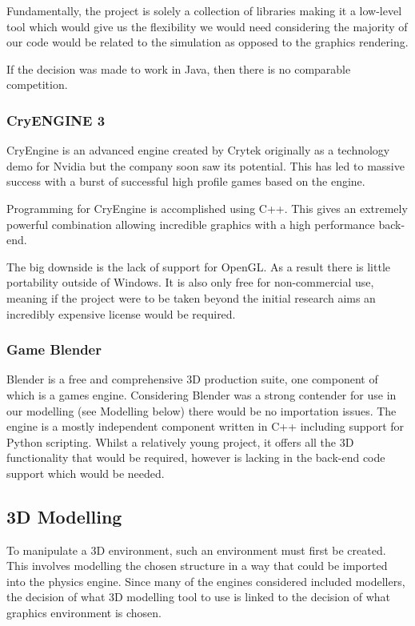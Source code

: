 Fundamentally, the project is solely a collection of libraries making
it a low-level tool which would give us the flexibility we would need
considering the majority of our code would be related to the simulation
as opposed to the graphics rendering.

If the decision was made to work in Java, then there is no comparable competition.


\subsubsection{CryENGINE 3}

CryEngine is an advanced engine created by Crytek originally as a
technology demo for Nvidia but the company soon saw its potential.
This has led to massive success with a burst of successful high profile
games based on the engine.

Programming for CryEngine is accomplished using C++. This gives an extremely
powerful combination allowing incredible graphics with a high performance
back-end.

The big downside is the lack of support for OpenGL. As a result there
is little portability outside of Windows. It is also only free for
non-commercial use, meaning if the project were to be taken beyond
the initial research aims an incredibly expensive license would be
required.


\subsubsection{Game Blender}

Blender is a free and comprehensive 3D production suite, one component
of which is a games engine. Considering Blender was a strong contender
for use in our modelling (see Modelling below) there would be no importation
issues. The engine is a mostly independent component written in C++
including support for Python scripting. Whilst a relatively young
project, it offers all the 3D functionality that would be required,
however is lacking in the back-end code support which would be needed.


\subsection{3D Modelling}

To manipulate a 3D environment, such an environment must first be created. This
involves modelling the chosen structure in a way that could be imported
into the physics engine. Since many of the engines considered included
modellers, the decision of what 3D modelling tool to use is linked to the decision of what graphics environment is chosen. 

